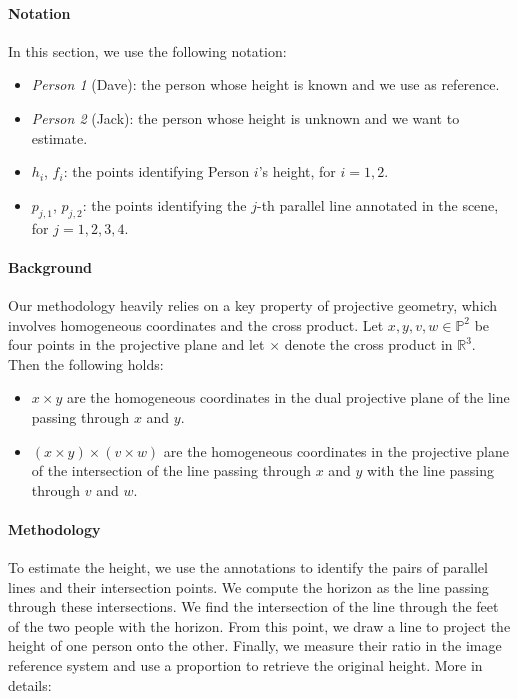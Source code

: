 \paragraph{Notation} In this section, we use the following notation:

\begin{itemize}
    \item \textit{Person 1} (Dave): the person whose height is known and we use as reference.
    \item \textit{Person 2} (Jack): the person whose height is unknown and we want to estimate.
    \item $h_i$, $f_i$: the points identifying Person $i$'s height, for $i=1,2$.
    \item $p_{j,1}$, $p_{j,2}$: the points identifying the $j$-th parallel line annotated in the scene, for $j=1,2,3,4$.
\end{itemize}

\paragraph{Background} Our methodology heavily relies on a key property of projective geometry, which involves homogeneous coordinates and the cross product. Let $x,y,v,w \in\mathbb{P}^2$ be four points in the projective plane and let $\times$ denote the cross product in $\mathbb{R}^3$. Then the following holds:

\begin{itemize}
    \item $x \times y$ are the homogeneous coordinates in the dual projective plane of the line passing through $x$ and $y$. 
    \item $(x \times y) \times (v \times w)$ are the homogeneous coordinates in the projective plane of the intersection of the line passing through $x$ and $y$ with the line passing through $v$ and $w$.
\end{itemize}

\paragraph{Methodology} To estimate the height, we use the annotations to identify the pairs of parallel lines and their intersection points. We compute the horizon as the line passing through these intersections. We find the intersection of the line through the feet of the two people with the horizon. From this point, we draw a line to project the height of one person onto the other. Finally, we measure their ratio in the image reference system and use a proportion to retrieve the original height. More in details:

